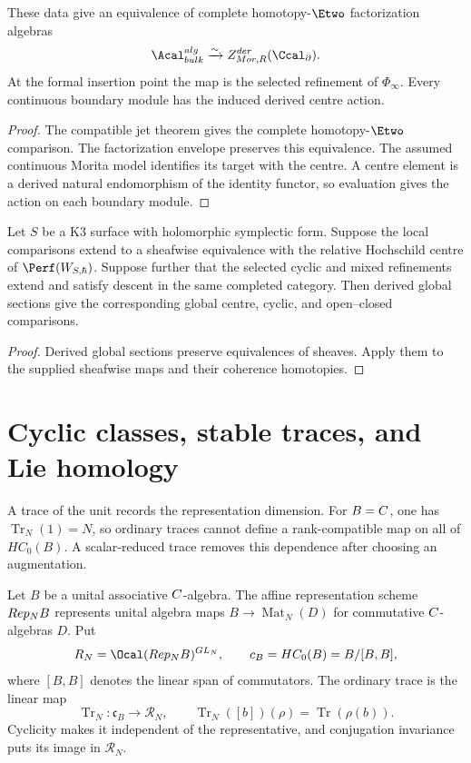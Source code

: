 \begin{theorem}
These data give an equivalence of complete homotopy-$\Etwo$ factorization algebras
\[
 \Acal_{\mathrm{bulk}}^{\mathrm{alg}}
 \xrightarrow{\sim}
 Z^{\mathrm{der}}_{\mathrm{Mor},R}(\Ccal_\partial).
\]
At the formal insertion point the map is the selected refinement of $\Phi_\infty$.
Every continuous boundary module has the induced derived centre action.
\end{theorem}
\begin{proof}
The compatible jet theorem gives the complete homotopy-$\Etwo$ comparison.
The factorization envelope preserves this equivalence.
The assumed continuous Morita model identifies its target with the centre.
A centre element is a derived natural endomorphism of the identity functor,
so evaluation gives the action on each boundary module.
\end{proof}

\begin{corollary}
Let $S$ be a K3 surface with holomorphic symplectic form.
Suppose the local comparisons extend to a sheafwise equivalence with the
relative Hochschild centre of $\Perf(\mathcal W_{S,\hbar})$.
Suppose further that the selected cyclic and mixed refinements extend
and satisfy descent in the same completed category.
Then derived global sections give the corresponding global centre,
cyclic, and open--closed comparisons.
\end{corollary}
\begin{proof}
Derived global sections preserve equivalences of sheaves.
Apply them to the supplied sheafwise maps and their coherence homotopies.
\end{proof}

\chapter{Cyclic classes, stable traces, and Lie homology}
A trace of the unit records the representation dimension.
For $B=C$, one has $\operatorname{Tr}_N(1)=N$, so ordinary traces
cannot define a rank-compatible map on all of $HC_0(B)$.
A scalar-reduced trace removes this dependence after choosing an augmentation.

Let $B$ be a unital associative $C$-algebra.
The affine representation scheme $Rep_NB$ represents unital algebra maps
$B\to\operatorname{Mat}_N(D)$ for commutative $C$-algebras $D$.
Put
\[
 \mathcal R_N=\Ocal(\Rep_NB)^{GL_N},\qquad
 \mathfrak c_B=HC_0(B)=B/[B,B],
\]
where $[B,B]$ denotes the linear span of commutators.
The ordinary trace is the linear map
\[
 \operatorname{Tr}_N:\mathfrak c_B\longrightarrow\mathcal R_N,
 \qquad
 \operatorname{Tr}_N([b])(\rho)=\operatorname{Tr}(\rho(b)).
\]
Cyclicity makes it independent of the representative, and conjugation
invariance puts its image in $\mathcal R_N$.


